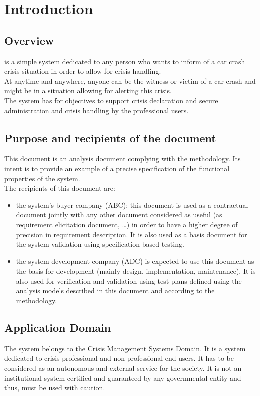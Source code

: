 
\chapter{Introduction}
\label{chap:introduction}

\section{Overview}
\msricrash is a simple system dedicated to any person who wants to inform of a car crash crisis situation in order to allow for crisis handling.\\
At anytime and anywhere, anyone can be the witness or victim of a car crash and might be in a situation allowing for alerting this crisis.\\
The \msricrash system has for objectives to support crisis declaration and secure administration and crisis handling by the \msricrash professional users.

\section{Purpose and recipients of the document}
This document is an analysis document complying with the \msrmessir methodology\cite{messirbook}. Its intent is to provide an example of a precise specification of the functional properties of the \msricrash system.\\

The recipients of this document are:
\begin{itemize}
    \item the \msricrash system's buyer company (ABC): this document is used as a contractual document jointly with any other document considered as useful (as requirement elicitation document, \ldots) in order to have a higher degree of precision in requirement description. It is also used as a basis document for the \msricrash system validation using specification based testing.
    \item the \msricrash system development company (ADC) is expected to use this document as the basis for development (mainly design, implementation, maintenance). It is also  used for verification and validation using test plans defined using the analysis models described in this document and according to the \msrmessir methodology.
\end{itemize} 

\section{Application Domain}
The \msricrash system belongs to the Crisis Management Systems Domain. It is a system dedicated to crisis professional and non professional end users. It has to be considered as an autonomous and external service for the society. It is not an institutional system certified and guaranteed by any governmental entity and thus, must be used with caution.

